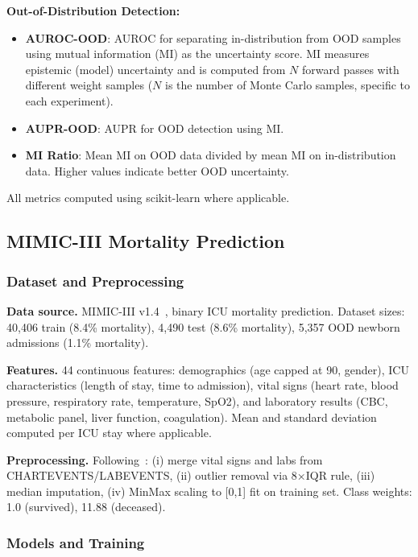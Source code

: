 \documentclass{article}
\theoremstyle{plain}
\theoremstyle{definition}
\theoremstyle{remark}
\begin{document}
\textbf{Out-of-Distribution Detection:}
\begin{itemize}
    \item \textbf{AUROC-OOD}: AUROC for separating in-distribution from OOD samples using mutual information (MI) as the uncertainty score. MI measures epistemic (model) uncertainty and is computed from $N$ forward passes with different weight samples ($N$ is the number of Monte Carlo samples, specific to each experiment).
    
    \item \textbf{AUPR-OOD}: AUPR for OOD detection using MI.
    
    \item \textbf{MI Ratio}: Mean MI on OOD data divided by mean MI on in-distribution data. Higher values indicate better OOD uncertainty.
\end{itemize}

All metrics computed using scikit-learn where applicable.
\subsection{MIMIC-III Mortality Prediction}\label{app:exp:mimic}

\subsubsection{Dataset and Preprocessing}

\textbf{Data source.} MIMIC-III v1.4~\cite{johnson2016mimic}, binary ICU mortality prediction. Dataset sizes: 40,406 train (8.4\% mortality), 4,490 test (8.6\% mortality), 5,357 OOD newborn admissions (1.1\% mortality).

\textbf{Features.} 44 continuous features: demographics (age capped at 90, gender), ICU characteristics (length of stay, time to admission), vital signs (heart rate, blood pressure, respiratory rate, temperature, SpO2), and laboratory results (CBC, metabolic panel, liver function, coagulation). Mean and standard deviation computed per ICU stay where applicable.

\textbf{Preprocessing.} Following~\citet{ruhe2019bayesian}: (i) merge vital signs and labs from CHARTEVENTS/LABEVENTS, (ii) outlier removal via 8×IQR rule, (iii) median imputation, (iv) MinMax scaling to [0,1] fit on training set. Class weights: 1.0 (survived), 11.88 (deceased).

\subsubsection{Models and Training}
\end{document}
